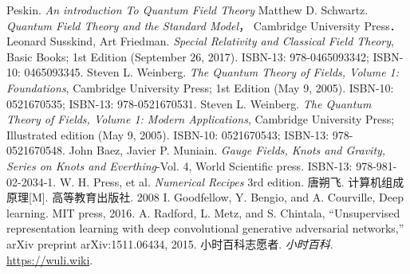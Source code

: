 \begin{thebibliography}{99}
Peskin. \textsl{An introduction To Quantum Field Theory}
Matthew D. Schwartz. \textsl{Quantum Field Theory and the Standard Model}， Cambridge University Press．
Leonard Susskind, Art Friedman. \textsl{Special Relativity and Classical Field Theory}, Basic Books; 1st Edition (September 26, 2017). ISBN-13: 978-0465093342; ISBN-10: 0465093345. 
Steven L. Weinberg. \textsl{The Quantum Theory of Fields, Volume 1: Foundations}, Cambridge University Press; 1st Edition (May 9, 2005). ISBN-10: 0521670535; ISBN-13: 978-0521670531. 
Steven L. Weinberg. \textsl{The Quantum Theory of Fields, Volume 1: Modern Applications}, Cambridge University Press; Illustrated edition (May 9, 2005). ISBN-10: 0521670543; ISBN-13: 978-0521670548. 
John Baez, Javier P. Muniain. \textsl{Gauge Fields, Knots and Gravity, Series on Knots and Everthing}-Vol. 4, World Scientific press. ISBN-13: 978-981-02-2034-1. 
W. H. Press, et al. \textsl{Numerical Recipes} 3rd edition. 
唐朔飞. 计算机组成原理[M]. 高等教育出版社. 2008
I. Goodfellow, Y. Bengio, and A. Courville, Deep learning. MIT press, 2016.
A. Radford, L. Metz, and S. Chintala, “Unsupervised representation learning with deep convolutional generative adversarial networks,” arXiv preprint arXiv:1511.06434, 2015.
小时百科志愿者. \textsl{小时百科}. \href{https://wuli.wiki}{https://wuli.wiki}. 
\end{thebibliography}
